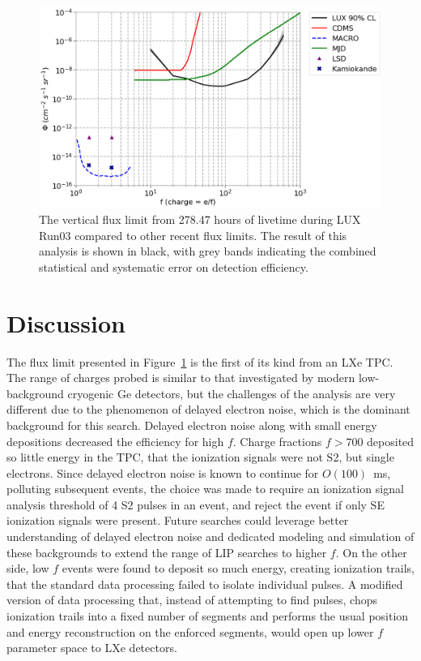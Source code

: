 \begin{figure}[htbp]
\begin{center}
\includegraphics[width=\textwidth]{figures/lips/limit.png}
\caption{The vertical flux limit from 278.47 hours of livetime during \acs{LUX} Run03 compared to other recent flux limits. The result of this analysis is shown in black, with grey bands indicating the combined statistical and systematic error on detection efficiency.}
\label{fig:limit}
\end{center}
\end{figure}

\section{Discussion}
The flux limit presented in Figure~\ref{fig:limit} is the first of its kind from an \ac{LXe} \ac{TPC}. The range of charges probed is similar to that investigated by modern low-background cryogenic Ge detectors, but the challenges of the analysis are very different due to the phenomenon of delayed electron noise, which is the dominant background for this search. Delayed electron noise along with small energy depositions decreased the efficiency for high $f$. Charge fractions $f > 700$ deposited so little energy in the \ac{TPC}, that the ionization signals were not S2, but single electrons. Since delayed electron noise is known to continue for $O(100)$~ms, polluting subsequent events, the choice was made to require an ionization signal analysis threshold of 4 S2 pulses in an event, and reject the event if only SE ionization signals were present. Future searches could leverage better understanding of delayed electron noise and dedicated modeling and simulation of these backgrounds to extend the range of \ac{LIP} searches to higher $f$. On the other side, low $f$ events were found to deposit so much energy, creating ionization trails, that the standard data processing failed to isolate individual pulses. A modified version of data processing that, instead of attempting to find pulses, chops ionization trails into a fixed number of segments and performs the usual position and energy reconstruction on the enforced segments, would open up lower $f$ parameter space to \ac{LXe} detectors. 



